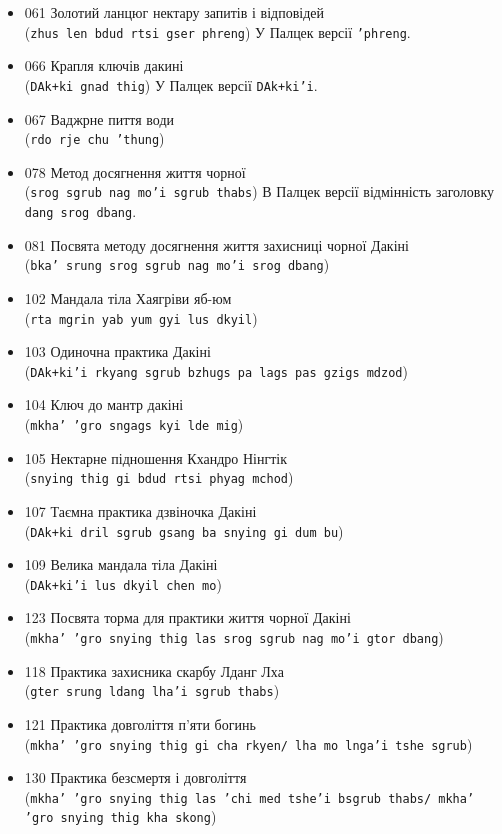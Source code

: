 \documentclass{article}
\begin{document}
\begin{itemize}
\item 061 Золотий ланцюг нектару запитів і відповідей \\ (\texttt{zhus len bdud rtsi gser phreng}) У Палцек версії \texttt{'phreng}.
\item 066 Крапля ключів дакині \\ (\texttt{DAk+ki gnad thig}) У Палцек версії \texttt{DAk+ki'i}.
\item 067 Ваджрне пиття води \\ (\texttt{rdo rje chu 'thung})
\item 078 Метод досягнення життя чорної \\ (\texttt{srog sgrub nag mo'i sgrub thabs}) В Палцек версії відмінність заголовку \texttt{dang srog dbang}.
\item 081 Посвята методу досягнення життя захисниці чорної Дакіні \\ (\texttt{bka' srung srog sgrub nag mo'i srog dbang})
\item 102 Мандала тіла Хаягріви яб-юм \\ (\texttt{rta mgrin yab yum gyi lus dkyil})
\item 103 Одиночна практика Дакіні \\ (\texttt{DAk+ki'i rkyang sgrub bzhugs pa lags pas gzigs mdzod})
\item 104 Ключ до мантр дакіні \\ (\texttt{mkha' 'gro sngags kyi lde mig})
\item 105 Нектарне підношення Кхандро Нінгтік \\ (\texttt{snying thig gi bdud rtsi phyag mchod})
\item 107 Таємна практика дзвіночка Дакіні \\ (\texttt{DAk+ki dril sgrub gsang ba snying gi dum bu})
\item 109 Велика мандала тіла Дакіні \\ (\texttt{DAk+ki'i lus dkyil chen mo})
\item 123 Посвята торма для практики життя чорної Дакіні \\ (\texttt{mkha' 'gro snying thig las srog sgrub nag mo'i gtor dbang})
\item 118 Практика захисника скарбу Лданг Лха \\ (\texttt{gter srung ldang lha'i sgrub thabs})
\item 121 Практика довголіття п'яти богинь \\ (\texttt{mkha' 'gro snying thig gi cha rkyen/ lha mo lnga'i tshe sgrub})
\item 130 Практика безсмертя і довголіття \\ (\texttt{mkha' 'gro snying thig las 'chi med tshe'i bsgrub thabs/ mkha' 'gro snying thig kha skong})
\end{itemize}
\endgroup
\end{document}
